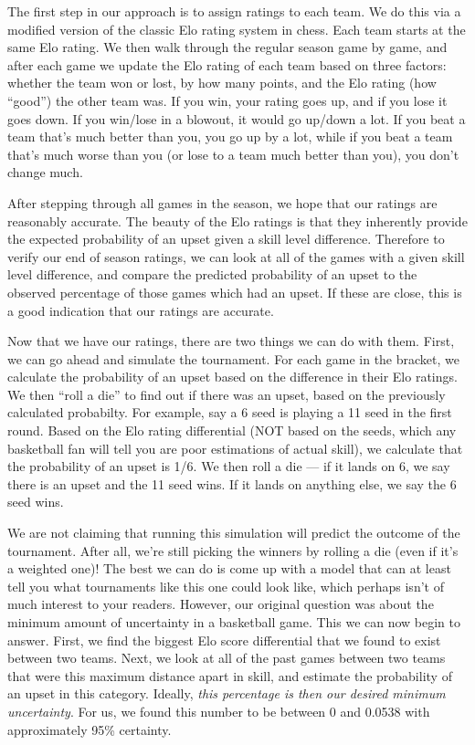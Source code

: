 \documentclass{article}
\begin{document}
The first step in our approach is to assign ratings to each team. We do this via a modified version of the classic Elo rating system in chess. Each team starts at the same Elo rating. We then walk through the regular season game by game, and after each game we update the Elo rating of each team based on three factors: whether the team won or lost, by how many points, and the Elo rating (how ``good'') the other team was. If you win, your rating goes up, and if you lose it goes down. If you win/lose in a blowout, it would go up/down a lot. If you beat a team that's much better than you, you go up by a lot, while if you beat a team that's much worse than you (or lose to a team much better than you), you don't change much. 

After stepping through all games in the season, we hope that our ratings are reasonably accurate. The beauty of the Elo ratings is that they inherently provide the expected probability of an upset given a skill level difference. Therefore to verify our end of season ratings, we can look at all of the games with a given skill level difference, and compare the predicted probability of an upset to the observed percentage of those games which had an upset. If these are close, this is a good indication that our ratings are accurate.

Now that we have our ratings, there are two things we can do with them. First, we can go ahead and simulate the tournament. For each game in the bracket, we calculate the probability of an upset based on the difference in their Elo ratings. We then ``roll a die'' to find out if there was an upset, based on the previously calculated probabilty. For example, say a 6 seed is playing a 11 seed in the first round. Based on the Elo rating differential (NOT based on the seeds, which any basketball fan will tell you are poor estimations of actual skill), we calculate that the probability of an upset is 1/6. We then roll a die --- if it lands on 6, we say there is an upset and the 11 seed wins. If it lands on anything else, we say the 6 seed wins.

We are not claiming that running this simulation will predict the outcome of the tournament. After all, we're still picking the winners by rolling a die (even if it's a weighted one)! The best we can do is come up with a model that can at least tell you what tournaments like this one could look like, which perhaps isn't of much interest to your readers. However, our original question was about the minimum amount of uncertainty in a basketball game. This we can now begin to answer. First, we find the biggest Elo score differential that we found to exist between two teams. Next, we look at all of the past games between two teams that were this maximum distance apart in skill, and estimate the probability of an upset in this category. Ideally, \textit{this percentage is then our desired minimum uncertainty}. For us, we found this number to be between 0 and 0.0538 with approximately 95\% certainty. 
\end{document}
